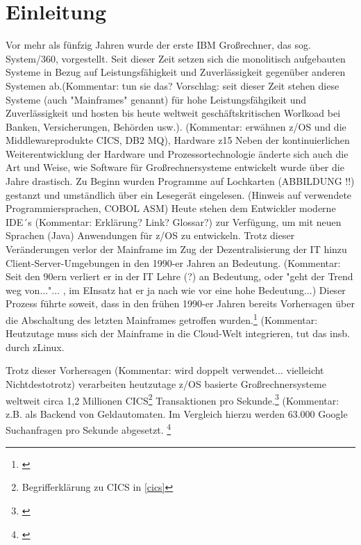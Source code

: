 \chapter{Einleitung}\label{ch:einleitung}
Vor mehr als fünfzig Jahren wurde der erste IBM Großrechner, das sog. System/360, vorgestellt.
Seit dieser Zeit setzen sich die monolitisch aufgebauten Systeme in Bezug auf Leistungsfähigkeit und Zuverlässigkeit gegenüber
anderen Systemen ab.(Kommentar: tun sie das? Vorschlag: seit dieser Zeit stehen diese Systeme (auch "Mainframes" genannt) für hohe
Leistungsfähgikeit und Zuverlässigkeit und hosten bis heute weltweit geschäftskritischen Worlkoad bei Banken, Versicherungen, 
Behörden usw.). 
(Kommentar: erwähnen z/OS und die Middlewareprodukte CICS, DB2 MQ), Hardware z15
Neben der kontinuierlichen Weiterentwicklung der Hardware und Prozessortechnologie änderte sich auch die Art und  Weise, wie Software für Großrechnersysteme entwickelt wurde über die Jahre drastisch.
Zu Beginn wurden Programme auf Lochkarten (ABBILDUNG !!) gestanzt und umständlich über ein Lesegerät eingelesen.
(Hinweis auf verwendete Programmiersprachen, COBOL ASM)
Heute stehen dem Entwickler moderne IDE´s (Kommentar: Erklärung? Link? Glossar?) zur Verfügung, um mit neuen Sprachen (Java) Anwendungen
für z/OS zu entwickeln.
Trotz dieser Veränderungen verlor der Mainframe im Zug der Dezentralisierung der IT hinzu Client-Server-Umgebungen in den 1990-er Jahren an Bedeutung. 
(Kommentar: Seit den 90ern verliert er in der IT Lehre (?)  an Bedeutung, oder "geht der Trend weg von..."... , im EInsatz hat er ja nach wie vor eine hohe Bedeutung...) 
Dieser Prozess führte soweit, dass in den frühen 1990-er Jahren bereits Vorhersagen über die Abschaltung des letzten Mainframes getroffen wurden.\footnote{\cite{Alsop.1993}}
\cite{Ceruzzi.2003}
(Kommentar: Heutzutage muss sich der Mainframe in die Cloud-Welt integrieren, tut das insb. durch zLinux.

Trotz dieser Vorhersagen (Kommentar: wird doppelt verwendet... vielleicht Nichtdestotrotz) verarbeiten heutzutage z/OS basierte Großrechnersysteme weltweit circa 1,2 Millionen CICS\footnote{Begrifferklärung zu CICS in \ref{cics}} Transaktionen pro Sekunde.\footnote{\cite{IBM.2019}} (Kommentar:  z.B. als Backend von Geldautomaten.
Im Vergleich hierzu werden 63.000 Google Suchanfragen pro Sekunde abgesetzt. \footnote{\cite{Sullivan.2016}}

